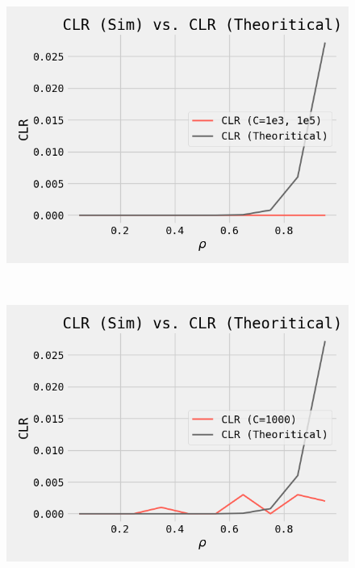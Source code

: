 \begin{figure}[ht!]
 \centering
 \captionsetup{justification=centering}
 \begin{minipage}[]{0.33\linewidth}
  \centering
 \includegraphics[width=\linewidth]{Figures/task3_0.png}
 \label{fig4} 
 \end{minipage}~\begin{minipage}[]{0.33\linewidth}
  \centering
  \includegraphics[width=\linewidth]{Figures/task3_1.png}
  \label{fig5}
 \end{minipage}~\begin{minipage}[]{0.33\linewidth}

\end{minipage}
\end{figure}
